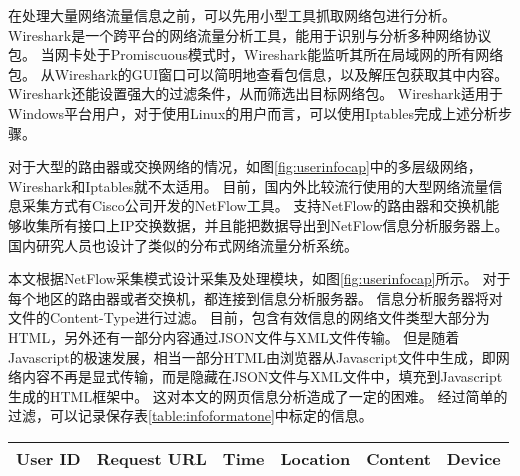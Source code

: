 \begin{center}
\label{fig:userinfocap}
\end{center}

在处理大量网络流量信息之前，可以先用小型工具抓取网络包进行分析。
Wireshark是一个跨平台的网络流量分析工具，能用于识别与分析多种网络协议包。
当网卡处于Promiscuous模式时，Wireshark能监听其所在局域网的所有网络包。
从Wireshark的GUI窗口可以简明地查看包信息，以及解压包获取其中内容。
Wireshark还能设置强大的过滤条件，从而筛选出目标网络包。
Wireshark适用于Windows平台用户，对于使用Linux的用户而言，可以使用Iptables完成上述分析步骤。

对于大型的路由器或交换网络的情况，如图\ref{fig:userinfocap}中的多层级网络，Wireshark和Iptables就不太适用。
目前，国内外比较流行使用的大型网络流量信息采集方式有Cisco公司开发的NetFlow工具。
支持NetFlow的路由器和交换机能够收集所有接口上IP交换数据，并且能把数据导出到NetFlow信息分析服务器上。
国内研究人员也设计了类似的分布式网络流量分析系统\parencite{乔媛媛2014基于,延皓2011基于流量监测的网络用户行为分析,董超2013基于网络流量监测的移动互联网特征研究}。

本文根据NetFlow采集模式设计采集及处理模块，如图\ref{fig:userinfocap}所示。
对于每个地区的路由器或者交换机，都连接到信息分析服务器。
信息分析服务器将对文件的Content-Type进行过滤。
目前，包含有效信息的网络文件类型大部分为HTML，另外还有一部分内容通过JSON文件与XML文件传输。
但是随着Javascript的极速发展，相当一部分HTML由浏览器从Javascript文件中生成，即网络内容不再是显式传输，而是隐藏在JSON文件与XML文件中，填充到Javascript生成的HTML框架中。
这对本文的网页信息分析造成了一定的困难。
经过简单的过滤，可以记录保存表\ref{table:infoformatone}中标定的信息。
\begin{center}
\label{table:infoformatone}
\begin{tabular}{c|c|c|c|c|c}
	\hline
	User ID & Request URL & Time & Location & Content & Device \\
	\hline
\end{tabular}
\end{center}

